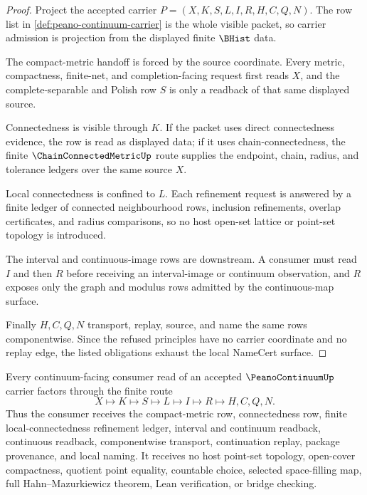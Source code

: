 \begin{proof}
Project the accepted carrier $P=(X,K,S,L,I,R,H,C,Q,N)$. The row list in \autoref{def:peano-continuum-carrier} is the whole visible packet, so carrier admission is projection from the displayed finite $\BHist$ data.

The compact-metric handoff is forced by the source coordinate. Every metric, compactness, finite-net, and completion-facing request first reads $X$, and the complete-separable and Polish row $S$ is only a readback of that same displayed source.

Connectedness is visible through $K$. If the packet uses direct connectedness evidence, the row is read as displayed data; if it uses chain-connectedness, the finite $\ChainConnectedMetricUp$ route supplies the endpoint, chain, radius, and tolerance ledgers over the same source $X$.

Local connectedness is confined to $L$. Each refinement request is answered by a finite ledger of connected neighbourhood rows, inclusion refinements, overlap certificates, and radius comparisons, so no host open-set lattice or point-set topology is introduced.

The interval and continuous-image rows are downstream. A consumer must read $I$ and then $R$ before receiving an interval-image or continuum observation, and $R$ exposes only the graph and modulus rows admitted by the continuous-map surface.

Finally $H,C,Q,N$ transport, replay, source, and name the same rows componentwise. Since the refused principles have no carrier coordinate and no replay edge, the listed obligations exhaust the local NameCert surface.
\end{proof}

\begin{theorem}
\label{thm:peano-continuum-locally-connected-handoff}
Every continuum-facing consumer read of an accepted $\PeanoContinuumUp$ carrier factors through the finite route
$$
X \longmapsto K \longmapsto S \longmapsto L \longmapsto I \longmapsto R \longmapsto H,C,Q,N .
$$
Thus the consumer receives the compact-metric row, connectedness row, finite local-connectedness refinement ledger, interval and continuum readback, continuous readback, componentwise transport, continuation replay, package provenance, and local naming. It receives no host point-set topology, open-cover compactness, quotient point equality, countable choice, selected space-filling map, full Hahn--Mazurkiewicz theorem, Lean verification, or bridge checking.
\end{theorem}


